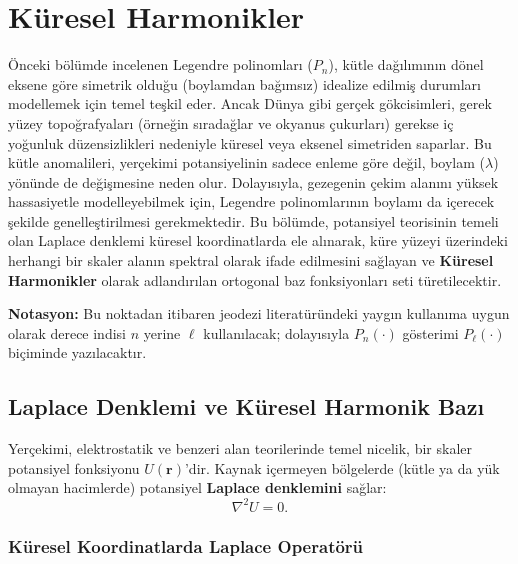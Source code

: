 

\newpage
\section{Küresel Harmonikler}

Önceki bölümde incelenen Legendre polinomları ($P_n$), kütle dağılımının dönel eksene göre simetrik olduğu (boylamdan bağımsız) idealize edilmiş durumları modellemek için temel teşkil eder. Ancak Dünya gibi gerçek gökcisimleri, gerek yüzey topoğrafyaları (örneğin sıradağlar ve okyanus çukurları)
gerekse iç yoğunluk düzensizlikleri nedeniyle küresel veya eksenel simetriden saparlar. Bu kütle anomalileri, yerçekimi potansiyelinin sadece enleme göre değil, boylam ($\lambda$) yönünde de değişmesine neden olur. Dolayısıyla, gezegenin çekim alanını yüksek hassasiyetle modelleyebilmek için,
Legendre polinomlarının boylamı da içerecek şekilde genelleştirilmesi gerekmektedir. Bu bölümde, potansiyel teorisinin temeli olan Laplace denklemi küresel koordinatlarda ele alınarak, küre yüzeyi üzerindeki herhangi bir skaler alanın spektral olarak ifade edilmesini sağlayan ve \textbf{Küresel Harmonikler} olarak adlandırılan ortogonal baz fonksiyonları seti türetilecektir. 

\textbf{Notasyon:} Bu noktadan itibaren jeodezi literatüründeki yaygın kullanıma uygun olarak derece indisi $n$ yerine $\ell$ kullanılacak; dolayısıyla $P_n(\cdot)$ gösterimi $P_\ell(\cdot)$ biçiminde yazılacaktır.

\subsection{Laplace Denklemi ve Küresel Harmonik Bazı}
\label{subsec:laplace_sep_sphharm}

Yerçekimi, elektrostatik ve benzeri alan teorilerinde temel nicelik,
bir skaler potansiyel fonksiyonu $U(\mathbf{r})$’dir.
Kaynak içermeyen bölgelerde (kütle ya da yük olmayan hacimlerde) potansiyel
\textbf{Laplace denklemini} sağlar:
\begin{equation}
\nabla^2 U = 0 .
\label{eq:laplace}
\end{equation}
\noindent

\subsubsection{Küresel Koordinatlarda Laplace Operatörü}


